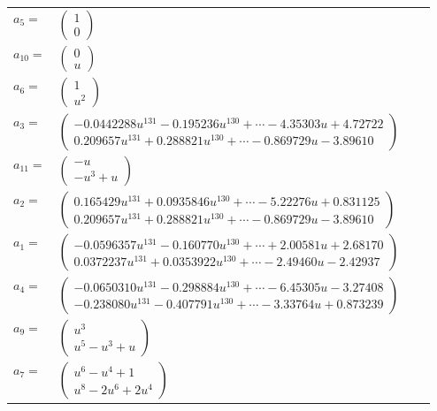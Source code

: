 \documentclass[1p]{elsarticle_modified}
\theoremstyle{definition}
\begin{document}
\begin{tabular}{m{7pt} m{180pt} m{7pt} m{180pt} }
\flushright $a_{5}=$&$\begin{pmatrix}1\\0\end{pmatrix}$ \\
\flushright $a_{10}=$&$\begin{pmatrix}0\\u\end{pmatrix}$ \\
\flushright $a_{6}=$&$\begin{pmatrix}1\\u^2\end{pmatrix}$ \\
\flushright $a_{3}=$&$\begin{pmatrix}-0.0442288 u^{131}-0.195236 u^{130}+\cdots-4.35303 u+4.72722\\0.209657 u^{131}+0.288821 u^{130}+\cdots-0.869729 u-3.89610\end{pmatrix}$ \\
\flushright $a_{11}=$&$\begin{pmatrix}- u\\- u^3+u\end{pmatrix}$ \\
\flushright $a_{2}=$&$\begin{pmatrix}0.165429 u^{131}+0.0935846 u^{130}+\cdots-5.22276 u+0.831125\\0.209657 u^{131}+0.288821 u^{130}+\cdots-0.869729 u-3.89610\end{pmatrix}$ \\
\flushright $a_{1}=$&$\begin{pmatrix}-0.0596357 u^{131}-0.160770 u^{130}+\cdots+2.00581 u+2.68170\\0.0372237 u^{131}+0.0353922 u^{130}+\cdots-2.49460 u-2.42937\end{pmatrix}$ \\
\flushright $a_{4}=$&$\begin{pmatrix}-0.0650310 u^{131}-0.298884 u^{130}+\cdots-6.45305 u-3.27408\\-0.238080 u^{131}-0.407791 u^{130}+\cdots-3.33764 u+0.873239\end{pmatrix}$ \\
\flushright $a_{9}=$&$\begin{pmatrix}u^3\\u^5- u^3+u\end{pmatrix}$ \\
\flushright $a_{7}=$&$\begin{pmatrix}u^6- u^4+1\\u^8-2 u^6+2 u^4\end{pmatrix}$ \\

\end{tabular}
\end{document}
